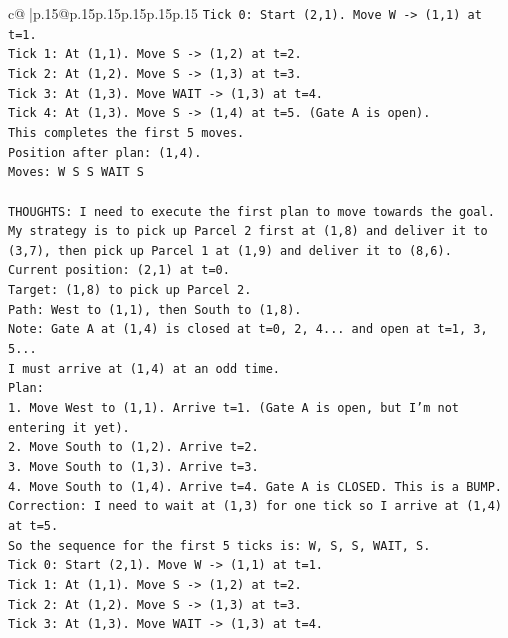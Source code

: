 \documentclass{article}
\begin{document}
{\begin{supertabular}{c@{$\;$}|p{.15\linewidth}@{}p{.15\linewidth}p{.15\linewidth}p{.15\linewidth}p{.15\linewidth}p{.15\linewidth}}
{{{\texttt{Tick 0: Start (2,1). Move W {-}> (1,1) at t=1.} \\
\texttt{Tick 1: At (1,1). Move S {-}> (1,2) at t=2.} \\
\texttt{Tick 2: At (1,2). Move S {-}> (1,3) at t=3.} \\
\texttt{Tick 3: At (1,3). Move WAIT {-}> (1,3) at t=4.} \\
\texttt{Tick 4: At (1,3). Move S {-}> (1,4) at t=5. (Gate A is open).} \\
\texttt{This completes the first 5 moves.} \\
\texttt{Position after plan: (1,4).} \\
\texttt{Moves: W S S WAIT S} \\
\\ 
\texttt{THOUGHTS: I need to execute the first plan to move towards the goal. My strategy is to pick up Parcel 2 first at (1,8) and deliver it to (3,7), then pick up Parcel 1 at (1,9) and deliver it to (8,6).} \\
\texttt{Current position: (2,1) at t=0.} \\
\texttt{Target: (1,8) to pick up Parcel 2.} \\
\texttt{Path: West to (1,1), then South to (1,8).} \\
\texttt{Note: Gate A at (1,4) is closed at t=0, 2, 4... and open at t=1, 3, 5...} \\
\texttt{I must arrive at (1,4) at an odd time.} \\
\texttt{Plan:} \\
\texttt{1. Move West to (1,1). Arrive t=1. (Gate A is open, but I'm not entering it yet).} \\
\texttt{2. Move South to (1,2). Arrive t=2.} \\
\texttt{3. Move South to (1,3). Arrive t=3.} \\
\texttt{4. Move South to (1,4). Arrive t=4. Gate A is CLOSED. This is a BUMP.} \\
\texttt{Correction: I need to wait at (1,3) for one tick so I arrive at (1,4) at t=5.} \\
\texttt{So the sequence for the first 5 ticks is: W, S, S, WAIT, S.} \\
\texttt{Tick 0: Start (2,1). Move W {-}> (1,1) at t=1.} \\
\texttt{Tick 1: At (1,1). Move S {-}> (1,2) at t=2.} \\
\texttt{Tick 2: At (1,2). Move S {-}> (1,3) at t=3.} \\
\texttt{Tick 3: At (1,3). Move WAIT {-}> (1,3) at t=4.} \\
}}}
\end{supertabular}}
\end{document}
